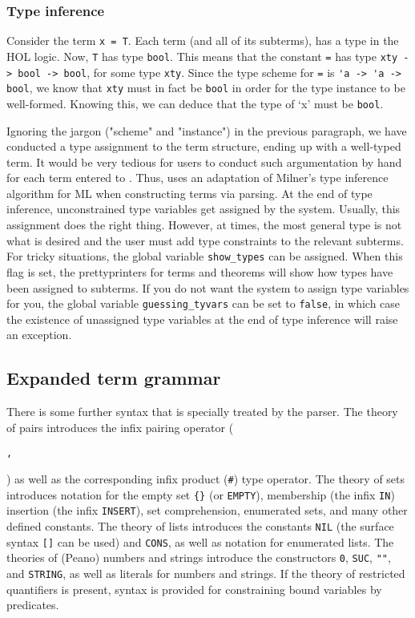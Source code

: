 {\subsubsection{Type inference}

Consider the term \verb+x = T+.  Each term (and all of its subterms),
has a type in the HOL logic. Now, \verb+T+ has type \verb+bool+. This
means that the constant \verb+=+ has type \verb+xty -> bool -> bool+,
for some type \verb+xty+. Since the type scheme for \verb+=+ is
\verb+'a -> 'a -> bool+, we know that \verb+xty+ must in fact be
\verb+bool+ in order for the type instance to be well-formed. Knowing
this, we can deduce that the type of `x' must be \verb+bool+.

Ignoring the jargon ("scheme" and "instance") in the previous
paragraph, we have conducted a type assignment to the term structure,
ending up with a well-typed term. It would be very tedious for users
to conduct such argumentation by hand for each term entered to \holn{}.
Thus, \holn{} uses an adaptation of Milner's type inference algorithm
for ML when constructing terms via parsing. At the end of type
inference, unconstrained type variables get assigned by the system.
Usually, this assignment does the right thing. However, at times, the
most general type is not what is desired and the user must add type
constraints to the relevant subterms. For tricky situations, the
global variable \verb+show_types+ can be assigned. When this flag is
set, the prettyprinters for terms and theorems will show how types
have been assigned to subterms. If you do not want the system to
assign type variables for you, the global variable
\verb+guessing_tyvars+ can be set to \verb+false+, in which case the
existence of unassigned type variables at the end of type inference
will raise an exception.

\subsection{Expanded term grammar}

There is some further syntax that is specially treated by the parser.
The theory of pairs introduces the infix pairing operator
(\begin{Large}\verb+,+\end{Large}) as well as the corresponding infix
product (\verb+#+) type operator. The theory of sets introduces
notation for the empty set \verb+{}+ (or \verb+EMPTY+), membership
(the infix \verb+IN+) insertion (the infix \verb+INSERT+), set
comprehension, enumerated sets, and many other defined constants. The
theory of lists introduces the constants \verb+NIL+ (the surface
syntax \verb+[]+ can be used) and \verb+CONS+, as well as notation for
enumerated lists. The theories of (Peano) numbers and strings
introduce the constructors \verb+0+, \verb+SUC+, \verb+""+, and
\verb+STRING+, as well as literals for numbers and strings. If the
theory of restricted quantifiers is present, syntax is provided for
constraining bound variables by predicates.

}
